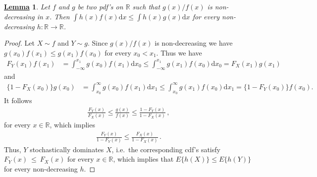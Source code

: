 \documentclass[12pt]{article}
\newtheorem{Lem}{\underline{\bf Lemma}}
\def \R {\mathbb{R} }
\begin{document}
\begin{Lem}\label{lemma:stoch_ord}
Let $f$ and $g$ be two pdf's on $\R$ such that $g(x)/f(x)$ is non-decreasing in $x$.
Then $\int h(x)f(x)\mathrm{d}x\leq \int h(x)g(x)\mathrm{d}x$ for every non-decreasing $h:\R\to\R$.
\end{Lem}
\begin{proof}
Let $X\sim f$ and $Y\sim g$.
Since $g(x)/f(x)$ is non-decreasing we have $g(x_0)f(x_1) \le g(x_1)f(x_0)$ for every $x_0 < x_1$. 
Thus we have %
\begin{align*}
F_{Y}(x_1) f(x_1) &= \int_{-\infty}^{x_1} g(x_0)f(x_1) \mathrm{d}x_0 \le  \int_{-\infty}^{x_1} g(x_1)f(x_0) \mathrm{d}x_0 = F_{X}(x_1) g(x_1)
\end{align*}
and
\begin{align*}
\{1-F_{X}(x_0)\} g(x_0) &= \int_{x_0}^{\infty} g(x_0)f(x_1) \mathrm{d}x_1 \le  \int_{x_0}^{\infty} g(x_1)f(x_0) \mathrm{d}x_1 = \{1-F_{Y}(x_0) \} f(x_0).
\end{align*}
It follows
\begin{align*}
\frac{F_{Y}(x)}{F_{X}(x)} \le \frac{g(x)}{f(x)}\le\frac{1-F_{Y}(x)}{1-F_{X}(x)}\,,%
\end{align*}
for every $x\in \R$,
which implies
\begin{align*}
\frac{F_{Y}(x)}{1-F_{Y}(x)} \le \frac{F_{X}(x)}{1-F_{X}(x)}\,.%
\end{align*}
Thus, $Y$ stochastically dominates $X$, i.e.\ the corresponding cdf's satisfy $F_Y(x)~\leq~F_X(x)$ for every $x\in \R$, which implies that $E\{h(X)\}\leq E\{h(Y)\}$ for every non-decreasing $h$.
\end{proof}
\end{document}
